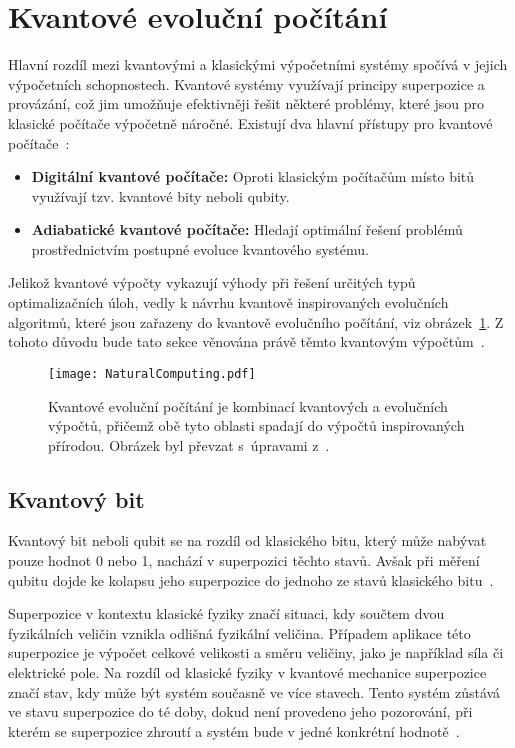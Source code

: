 \section{Kvantové evoluční počítání}
Hlavní rozdíl mezi kvantovými a klasickými výpočetními systémy spočívá v jejich výpočetních schopnostech.
Kvantové systémy využívají principy superpozice a provázání, což jim umožňuje efektivněji řešit některé problémy, které jsou pro klasické počítače výpočetně náročné. 
Existují dva hlavní přístupy pro kvantové počítače~\cite{NaturalComputing}:
\begin{itemize}
    \item \textbf{Digitální kvantové počítače:} Oproti klasickým počítačům místo bitů využívají tzv. kvantové bity neboli qubity.
    \item \textbf{Adiabatické kvantové počítače:} Hledají optimální řešení problémů prostřednictvím postupné evoluce kvantového systému.
\end{itemize}

Jelikož kvantové výpočty vykazují výhody při řešení určitých typů optimalizačních úloh, vedly k návrhu kvantově inspirovaných evolučních algoritmů, které jsou zařazeny do kvantově evolučního počítání, viz obrázek~\ref{fig:natural-computing}. 
Z tohoto důvodu bude tato sekce věnována právě těmto kvantovým výpočtům~\cite{NaturalComputing}. 
\begin{figure}[ht!]
    \centering
    \texttt{[image: NaturalComputing.pdf]}
    \caption{Kvantové evoluční počítání je kombinací kvantových a evolučních výpočtů, přičemž obě tyto oblasti spadají do výpočtů inspirovaných přírodou. Obrázek byl převzat s~úpravami z~\cite{QuantumComputing-QuantumInformation}.}
    \label{fig:natural-computing}
\end{figure}

\subsection{Kvantový bit}
Kvantový bit neboli qubit se na rozdíl od klasického bitu, který může nabývat pouze hodnot 0 nebo 1, nachází v superpozici těchto stavů. 
Avšak při měření qubitu dojde ke kolapsu jeho superpozice do jednoho ze stavů klasického bitu~\cite{QuantumComputing-Curious}. 

Superpozice v kontextu klasické fyziky značí situaci, kdy součtem dvou fyzikálních veličin vznikla odlišná fyzikální veličina. 
Případem aplikace této superpozice je výpočet celkové velikosti a směru veličiny, jako je například síla či elektrické pole.
Na rozdíl od klasické fyziky v kvantové mechanice superpozice značí stav, kdy může být systém současně ve více stavech. 
Tento systém zůstává ve stavu superpozice do té doby, dokud není provedeno jeho pozorování, při kterém se superpozice zhroutí a systém bude v jedné konkrétní hodnotě~\cite{QuantumComputing-Curious}. 

